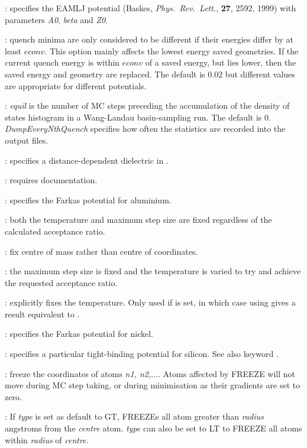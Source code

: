 : specifies the EAMLJ potential (Baskes, {\it Phys.~Rev.~Lett.\/},
{\bf 27}, 2592, 1999) with parameters {\it A0\/}, {\it beta\/} and {\it Z0\/}.

: quench minima are only considered to be different if their
energies differ by at least $econv$. This option mainly affects the lowest energy
saved geometries. If the current quench energy is within $econv$ of a saved energy, but
lies lower, then the saved energy and geometry are replaced.
The default is $0.02$ but different values are appropriate for different potentials.

: {\it equil} is the number of 
MC steps preceding the accumulation of the
density of states histogram in a Wang-Landau
basin-sampling run. The default is 0. {\it DumpEveryNthQuench} specifies how often the
statistics are recorded into the output files.

: specifies a distance-dependent dielectric in {\/}.

: requires documentation.

: specifies the Farkas potential for aluminium.

: both the temperature and maximum step size are fixed regardless of
the calculated acceptance ratio.

: fix centre of mass rather than centre of coordinates.

: the maximum step size is fixed and the temperature is varied to
try and achieve the requested acceptance ratio.

: explicitly fixes the temperature. Only used if {\/} is set, in 
which case using {\/} gives a result equivalent to {\/}.

: specifies the Farkas potential for nickel.

: specifies a particular tight-binding potential for silicon.
See also keyword {\/}.

: freeze the coordinates of atoms {\it n1, n2,$\ldots$}. Atoms affected by FREEZE will not move during MC step taking, 
or during minimisation as their gradients are set to zero.

: If {\it type} is set as default to {\textrm GT}, {\/} FREEZEs all atom greater than {\it radius} angstroms from the {\it centre} atom. {\it type} can also be set to LT to FREEZE all atoms within {\it radius} of {\it centre}.

